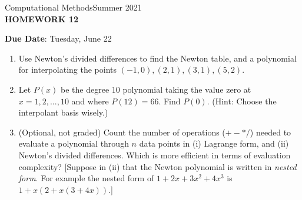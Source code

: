 \documentclass[12pt]{article}
\begin{document}
\begin{center}
Computational Methods\qquad Summer 2021
\\

\textbf{\large HOMEWORK 12}\\ 
\end{center}
\noindent \textbf{Due Date}: Tuesday, June 22\\

\begin{enumerate}
\item Use Newton's divided differences to find the Newton table, and a polynomial for interpolating the points $(-1,0),(2,1),(3,1),(5,2)$.
\item Let $P(x)$ be the degree 10 polynomial taking the value zero at  $x=1,2,...,10$ and where $P(12)=66$. Find $P(0)$. (Hint: Choose the interpolant basis wisely.)
\item (Optional, not graded) Count the number of operations ($+-*/$) needed to evaluate a polynomial through $n$ data points in (i) Lagrange form, and (ii) Newton's divided differences. Which is more efficient in terms of evaluation complexity? [Suppose in (ii) that the Newton polynomial is written in \emph{nested form}. For example the nested form of $1+2x+3x^2+4x^3$ is $1+x(2+x(3+4x))$.]
\end{enumerate}
\end{document}
